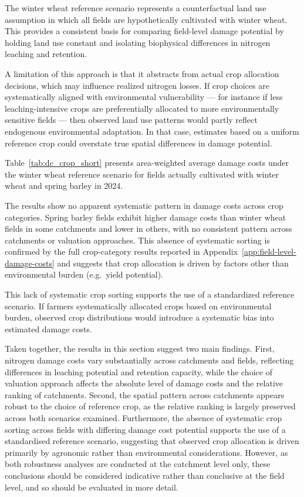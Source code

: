 \documentclass[12pt]{article}
\begin{document}
The winter wheat reference scenario represents a counterfactual land use assumption in which all fields are hypothetically cultivated with winter wheat. This provides a consistent basis for comparing field-level damage potential by holding land use constant and isolating biophysical differences in nitrogen leaching and retention.



A limitation of this approach is that it abstracts from actual crop allocation decisions, which may influence realized nitrogen losses. If crop choices are systematically aligned with environmental vulnerability --- for instance if less leaching-intensive crops are preferentially allocated to more environmentally sensitive fields --- then observed land use patterns would partly reflect endogenous environmental adaptation. In that case, estimates based on a uniform reference crop could overstate true spatial differences in damage potential.

Table~\ref{tab:dc_crop_short} presents area-weighted average damage costs under the 
winter wheat reference scenario for fields actually cultivated with winter wheat and 
spring barley in 2024. 

The results show no apparent systematic pattern in damage costs across crop categories. Spring barley fields exhibit higher damage costs than winter wheat fields in some catchments and lower in others, with no consistent pattern across catchments or valuation approaches. This absence of systematic sorting is confirmed by the full crop-category results reported in Appendix~\ref{app:field-level-damage-costs} and suggests that crop allocation is driven by factors other than environmental burden (e.g.\ yield potential).

This lack of systematic crop sorting supports the use of a standardized reference scenario. 
If farmers systematically allocated crops based on environmental burden, observed crop distributions would introduce a systematic bias into estimated damage costs.




Taken together, the results in this section suggest two main findings. First, nitrogen damage costs vary substantially across catchments and fields, reflecting differences in leaching potential and retention capacity, while the choice of valuation approach affects the absolute level of damage costs and the relative ranking of catchments. Second, the spatial pattern across catchments appears robust to the choice of reference crop, as the relative ranking is largely preserved across both scenarios examined. 
Furthermore, the absence of systematic crop sorting across fields with differing damage cost potential supports the use of a standardised reference scenario, suggesting that observed crop allocation is driven primarily by agronomic rather than environmental considerations. 
However, as both robustness analyses are conducted at the catchment level only, these conclusions should be considered indicative rather than conclusive at the field level, and so should be evaluated in more detail.
\end{document}
